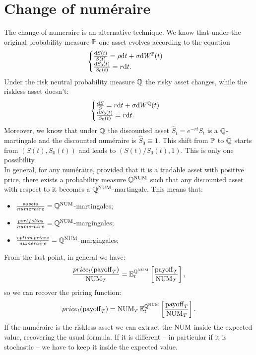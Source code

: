 \section{Change of numéraire} %
The change of numeraire is an alternative technique. We know that under the original probability measure $\mathbb{P}$ one asset evolves according to the equation
\begin{equation}
    \begin{cases}
    \frac{\dd S(t)}{S(t)} = \rho\dd t + \sigma\dd W^{\mathbb{P}}(t) \\
    \frac{\dd S_0(t)}{S_0(t)} = r\dd t.
    \end{cases}
\end{equation}
Under the risk neutral probability measure $\mathbb{Q}$ the risky asset changes, while the riskless asset doesn't:
\begin{equation}
    \begin{cases}
    \frac{\dd S}{S} = r\dd t + \sigma\dd W^{\mathbb{Q}}(t) \\
    \frac{\dd S_0(t)}{S_0(t)} = r\dd t.
    \end{cases}
\end{equation}
Moreover, we know that under $\mathbb{Q}$ the discounted asset $\hat{S}_t = e^{-rt}S_t$ is a $\mathbb{Q}$-martingale and the discounted numéraire is $\hat{S}_0 \equiv 1$. This shift from $\mathbb{P}$ to $\mathbb{Q}$ starts from $(S(t),S_0(t))$ and leads to $(S(t)/S_0(t),1)$. This is only one possibility. \\
In general, for any numéraire, provided that it is a tradable asset with positive price, there exists a probability measure $\mathbb{Q}^{\operatorname{NUM}}$ such that any discounted asset with respect to it becomes a $\mathbb{Q}^{\operatorname{NUM}}$-martingale. This means that:
\begin{itemize}
    \item $\frac{assets}{numeraire}=\mathbb{Q}^{\operatorname{NUM}}$-martingales;
    \item $\frac{portfolios}{numeraire}=\mathbb{Q}^{\operatorname{NUM}}$-margingales;
    \item $\frac{option\,prices}{numeraire}=\mathbb{Q}^{\operatorname{NUM}}$-margingales;
\end{itemize}
From the last point, in general we have:
\begin{equation}
    \frac{price_t(\operatorname{payoff}_T)}{\operatorname{NUM}_T} = \mathbb{E}_t^{\mathbb{Q}^{\operatorname{NUM}}} \left[\frac{\operatorname{payoff}_T}{\operatorname{NUM}_T}\right],
\end{equation}
so we can recover the pricing function:
\begin{equation}
    price_t(\operatorname{payoff}_T) = \operatorname{NUM}_T\mathbb{E}_t^{\mathbb{Q}^{\operatorname{NUM}}} \left[\frac{\operatorname{payoff}_T}{\operatorname{NUM}_T}\right].
\end{equation}
If the numéraire is the riskless asset we can extract the $\operatorname{NUM}$ inside the expected value, recovering the usual formula. If it is different -- in particular if it is stochastic -- we have to keep it inside the expected value.

